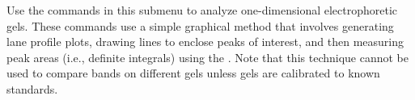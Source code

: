 Use the commands in this submenu to analyze one-dimensional electrophoretic
gels. These commands use a
simple graphical method that involves generating lane profile plots,
drawing lines to enclose peaks of interest, and then measuring peak
areas (i.e., definite
integrals) using the . Note that this technique
cannot be used to compare bands on different gels unless gels are
calibrated to known standards.
\begin{figure}[h]
\noindent {}
\end{figure}


